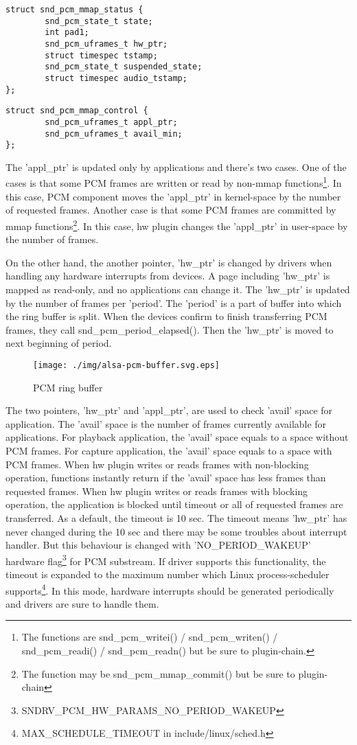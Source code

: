\documentclass[onecolumn]{article}
\begin{document}
\begin{verbatim}
struct snd_pcm_mmap_status {
        snd_pcm_state_t state;
        int pad1;
        snd_pcm_uframes_t hw_ptr;
        struct timespec tstamp;
        snd_pcm_state_t suspended_state;
        struct timespec audio_tstamp;
};
\end{verbatim}

\begin{verbatim}
struct snd_pcm_mmap_control {
        snd_pcm_uframes_t appl_ptr;
        snd_pcm_uframes_t avail_min;
};
\end{verbatim}

The 'appl\_ptr' is updated only by applications and there's two cases. One of the cases is that some PCM frames are written or read by non-mmap functions\footnote{The functions are snd\_pcm\_writei() / snd\_pcm\_writen() / snd\_pcm\_readi() / snd\_pcm\_readn() but be sure to plugin-chain.}. In this case, PCM component moves the 'appl\_ptr' in kernel-space by the number of requested frames. Another case is that some PCM frames are committed by mmap functions\footnote{The function may be snd\_pcm\_mmap\_commit() but be sure to plugin-chain}. In this case, hw plugin changes the 'appl\_ptr' in user-space by the number of frames.

On the other hand, the another pointer, 'hw\_ptr' is changed by drivers when handling any hardware interrupts from devices. A page including 'hw\_ptr' is mapped as read-only, and no applications can change it. The 'hw\_ptr' is updated by the number of frames per 'period'. The 'period' is a part of buffer into which the ring buffer is split. When the devices confirm to finish transferring PCM frames, they call snd\_pcm\_period\_elapsed(). Then the 'hw\_ptr' is moved to next beginning of period.

\begin{figure}[H]
	\centering
	\texttt{[image: ./img/alsa-pcm-buffer.svg.eps]}
	\caption{{PCM ring buffer}}
	\label{alsa-pcm-buffer}
\end{figure}

The two pointers, 'hw\_ptr' and 'appl\_ptr', are used to check 'avail' space for application. The 'avail' space is the number of frames currently available for applications. For playback application, the 'avail' space equals to a space without PCM frames. For capture application, the 'avail' space equals to a space with PCM frames. When hw plugin writes or reads frames with non-blocking operation, functions instantly return if the 'avail' space has less frames than requested frames. When hw plugin writes or reads frames with blocking operation, the application is blocked until timeout or all of requested frames are transferred. As a default, the timeout is 10 sec. The timeout means 'hw\_ptr' has never changed during the 10 sec and there may be some troubles about interrupt handler. But this behaviour is changed with 'NO\_PERIOD\_WAKEUP' hardware flag\footnote{SNDRV\_PCM\_HW\_PARAMS\_NO\_PERIOD\_WAKEUP} for PCM substream. If driver supports this functionality, the timeout is expanded to the maximum number which Linux process-scheduler supports\footnote{MAX\_SCHEDULE\_TIMEOUT in include/linux/sched.h}. In this mode, hardware interrupts should be generated periodically and drivers are sure to handle them.
\end{document}
